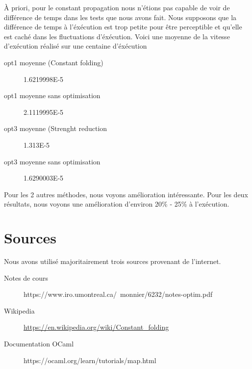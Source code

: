 \documentclass{article}
\begin{document}
À priori, pour le constant propagation nous n'étions pas capable de voir de différence de temps dans les tests que nous avons fait. Nous supposons que la différence de temps à l'éxécution est trop petite pour être perceptible et qu'elle est caché dans les fluctuations d'éxécution. Voici une moyenne de la vitesse d'exécution réalisé sur une centaine d'éxécution 
\begin{description}
\item[opt1 moyenne (Constant folding)] 1.6219998E-5
\item[opt1 moyenne sans optimisation] 2.1119995E-5
\item[opt3 moyenne (Strenght reduction] 1.313E-5
\item[opt3 moyenne sans optimisation] 1.6290003E-5
\end{description}
Pour les 2 autres méthodes, nous voyons amélioration intéressante. Pour les deux résultats, nous voyons une amélioration d'environ 20\% - 25\% à l'exécution. 

\section{Sources}
Nous avons utilisé majoritairement trois sources provenant de l'internet.
\begin{description}
\item[Notes de cours] https://www.iro.umontreal.ca/~monnier/6232/notes-optim.pdf
\item[Wikipedia] \href{https://en.wikipedia.org/wiki/Constant_folding}{https://en.wikipedia.org/wiki/Constant\_folding}
\item[Documentation OCaml] https://ocaml.org/learn/tutorials/map.html

\end{description}
\end{document}
